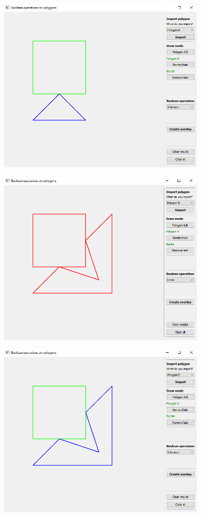 \documentclass[12pt]{article}
\begin{document}
\begin{center}
	\includegraphics[width=10cm]{./img/singular_intersect.png}
\end{center}

\begin{center}
	\includegraphics[width=10cm]{./img/singular_two_points_union.png}
\end{center}

\begin{center}
	\includegraphics[width=10cm]{./img/singular_two_points_intersect.png}
\end{center}
\end{document}
